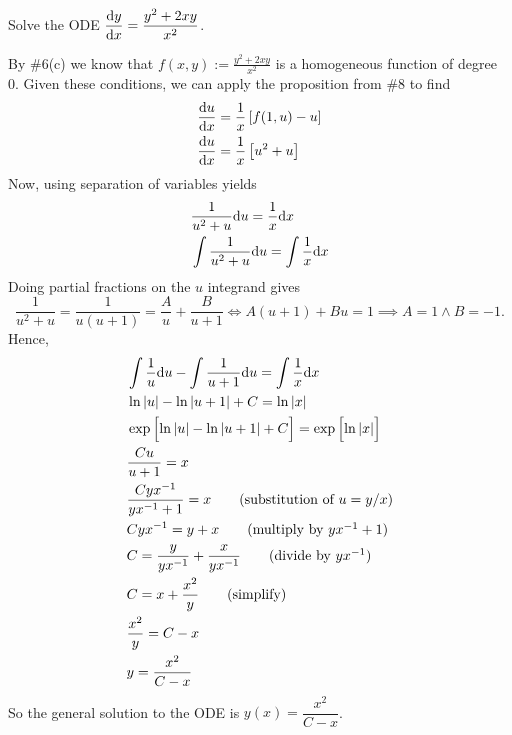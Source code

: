 Solve the ODE $\displaystyle \dv{y}{x} = \frac{y^2 + 2xy}{x^2}$.

\soln By \#6(c) we know that $f(x,y):= \frac{y^2 + 2xy}{x^2}$ is a homogeneous function of degree 0. Given these conditions, we can apply the proposition from \#8 to find
\begin{align*}
    &\dv{u}{x} = \over{x} \brac{f(1,u) - u}\\
    &\dv{u}{x} = \over{x} \brac{u^2 + u}
\end{align*} 
Now, using separation of variables yields
\begin{align*}
    &\frac{1}{u^2 + u} \dd u = \over{x} \dd x \\
    &\int \frac{1}{u^2 + u} \dd u = \int \over{x} \dd x \\
\end{align*}
Doing partial fractions on the $u$ integrand gives
$$\frac{1}{u^2 + u} = \frac{1}{u(u+1)} = \frac{A}{u} + \frac{B}{u+1} \iff A(u+1) + Bu = 1 \implies A = 1 \land B= -1.$$
Hence, 
\begin{align*}
    &\int \frac{1}{u} \dd u - \int \frac{1}{u+1} \dd u= \int \over{x} \dd x \\
    & \ln \abs{u} - \ln \abs{u+1} + C = \ln \abs{x}\\
    & \exp \Bigbrac{\ln \abs{u} - \ln \abs{u+1} + C} = \exp \Bigbrac{\ln \abs{x}}\\
    & \frac{Cu}{u+1} = x\\
    & \frac{Cyx^{-1}}{yx^{-1} + 1} = x \tag{substitution of $u = y/x$}\\
    & C yx^{-1} = y + x \tag{multiply by $yx^{-1} + 1$} \\
    & C = \frac{y}{yx^{-1}} + \frac{x}{yx^{-1}} \tag{divide by $yx^{-1}$}\\
    & C = x + \frac{x^2}{y} \tag{simplify}\\
    & \frac{x^2}{y} = C - x \\
    & y = \frac{x^2}{C-x}
\end{align*}
So the general solution to the ODE is $y(x) = \dfrac{x^2}{C-x}$.